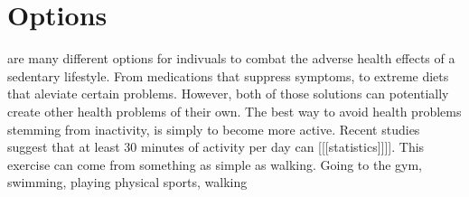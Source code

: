 \documentclass[12pt,article]{IEEEtran}
\begin{document}
\section{Options}
 are many different options for indivuals to combat the adverse health effects of a sedentary lifestyle. From medications that suppress symptoms, to extreme diets that aleviate certain problems. However, both of those solutions can potentially create other health problems of their own. The best way to avoid health problems stemming from inactivity, is simply to become more active. Recent studies suggest that at least 30 minutes of activity per day can [[[statistics]]]]. This exercise can come from something as simple as walking.
Going to the gym, swimming, playing physical sports, walking
\end{document}
